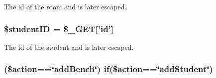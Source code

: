 \-The id of the room and is later escaped. \hypertarget{checkRooms_8php_af62eac6f1a6ea66c9f90093940147945}{
\subsubsection[{\$student\-I\-D}]{\setlength{\rightskip}{0pt plus 5cm}\$student\-I\-D = \$\-\_\-\-G\-E\-T\mbox{[}'id'\mbox{]}}}\label{checkRooms_8php_af62eac6f1a6ea66c9f90093940147945}
\-The id of the student and is later escaped. \hypertarget{checkRooms_8php_a8e6545ce0238da2ec377455ff693414e}{
\subsubsection[{if}]{ (\$action==\char`\"{}add\-Bench\char`\"{}) if(\$action==\char`\"{}add\-Student\char`\"{})}}\label{checkRooms_8php_a8e6545ce0238da2ec377455ff693414e}
